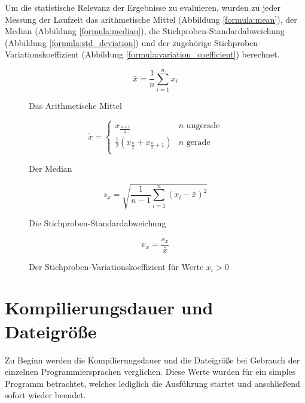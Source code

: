 Um die statistische Relevanz der Ergebnisse zu evaluieren, wurden zu jeder Messung der Laufzeit
das arithmetische Mittel (Abbildung \ref{formula:mean}),
der Median (Abbildung \ref{formula:median}),
die Stichproben-Standardabweichung (Abbildung \ref{formula:std_deviation}) und
der zugehörige Stichproben-Variationskoeffizient (Abbildung \ref{formula:variation_coefficient}) berechnet.
\cite{wtSkript}

\begin{figure}
	\caption{Das Arithmetische Mittel}
	\begin{equation}
		\label{formula:mean}
		\bar{x} = \frac{1}{n} \sum_{i=1}^n{x_i}
	\end{equation}
\end{figure}

\begin{figure}
	\caption{Der Median}
	\begin{equation}
		\label{formula:median}
		\tilde{x} =
		\begin{cases}
			x_{\frac{n + 1}{2}} & n \text{ ungerade} \\
			\frac{1}{2}(x_\frac{n}{2} + x_{\frac{n}{2} + 1}) & n \text{ gerade} \\
		\end{cases}
	\end{equation}
\end{figure}

\begin{figure}
	\caption{Die Stichproben-Standardabweichung}
	\begin{equation}
		\label{formula:std_deviation}
		s_x = \sqrt{\frac{1}{n - 1} \sum_{i=1}^n{(x_i - \bar{x})^2}}
	\end{equation}
\end{figure}

\begin{figure}
	\caption{Der Stichproben-Variationskoeffizient für Werte $x_i > 0$}
	\begin{equation}
		\label{formula:variation_coefficient}
		v_x = \frac{s_x}{\bar{x}}
	\end{equation}
\end{figure}



\section{Kompilierungsdauer und Dateigröße}\label{sec:compile_time_filesize}

Zu Beginn werden die Kompilierungsdauer und die Dateigröße bei Gebrauch der einzelnen Programmiersprachen
verglichen. Diese Werte wurden für ein simples Programm betrachtet, welches lediglich die Ausführung startet und
anschließend sofort wieder beendet.

